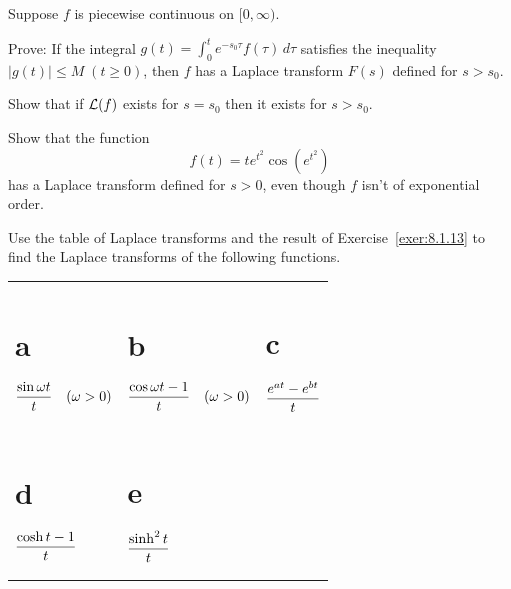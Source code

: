 \begin{exerciselist}
  \item\label{exer:8.1.14} Suppose $f$ is piecewise continuous on $[0,\infty)$.
  \begin{alist}
    \item %
    Prove: If the integral $g(t)=\int^{t}_{0}e^{-s_{0}\tau}f(\tau)\,d\tau$ satisfies the inequality
    $|g(t)|\le M\;(t\ge0)$, then $f$ has a Laplace transform $F(s)$ defined for $s>s_{0}$. 

    \item %
    Show that if ${\cal L}(f)$ exists for $s=s_{0}$ then it exists for $s>s_{0}$. \item %
    Show that the function
    \[
      f(t)=te^{t^{2}}\cos(e^{t^{2}})
    \]
    has a Laplace transform defined for $s>0$, even though $f$ isn't of exponential order.
  \end{alist}

  \item\label{exer:8.1.15} Use the table of Laplace transforms and the result of
        Exercise~\ref{exer:8.1.13} to find the Laplace transforms of the following functions.

  \begin{tabular}[t]{@{}p{112pt}@{}p{112pt}@{}p{112pt}}
    \part{a} $\displaystyle{\frac{\sin\omega t}{t}\quad(\omega>0)}$ & \part{b} $\displaystyle{\frac{\cos\omega t-1}{t}}\quad(\omega>0)$ & \part{c} $\displaystyle{\frac{e^{at}-e^{bt}}{t}}$ \\[2\jot]
    \part{d} $\displaystyle{\frac{\cosh t-1}{t}}$                   & \part{e} $\displaystyle{\frac{\sinh^{2}t}{t}}$
  \end{tabular}


\end{exerciselist}
